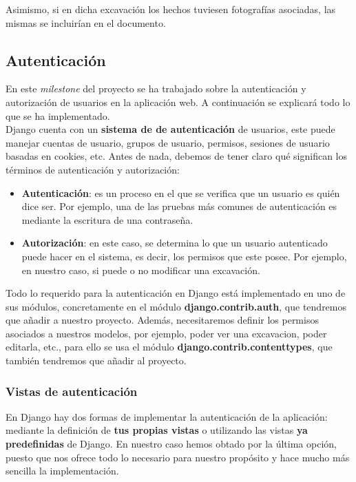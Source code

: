 Asimismo, si en dicha excavación los hechos tuviesen fotografías asociadas, las mismas
se incluirían en el documento.

\subsection{Autenticación}
En este \textit{milestone} del proyecto se ha trabajado sobre la autenticación y
autorización de usuarios en la aplicación web. A continuación se explicará todo lo que se
ha implementado.\\

Django cuenta con un \textbf{sistema de de autenticación} \cite{django-auth} de usuarios,
este puede manejar cuentas de usuario, grupos de usuario, permisos, sesiones de usuario
basadas en cookies, etc. Antes de nada, debemos de tener claro qué significan los términos
de autenticación y autorización:

    \begin{itemize}
        \item \textbf{Autenticación}: es un proceso en el que se verifica que un usuario
        es quién dice ser. Por ejemplo, una de las pruebas más comunes de autenticación
        es mediante la escritura de una contraseña.
        \item \textbf{Autorización}: en este caso, se determina lo que un usuario
        autenticado puede hacer en el sistema, es decir, los permisos que este posee. Por
        ejemplo, en nuestro caso, si puede o no modificar una excavación.
    \end{itemize}

Todo lo requerido para la autenticación en Django está implementado en uno de sus módulos,
concretamente en el módulo \textbf{django.contrib.auth}, que tendremos que añadir a
nuestro proyecto. Además, necesitaremos definir los permisos asociados a nuestros modelos,
por ejemplo, poder ver una excavacion, poder editarla, etc., para ello se usa el módulo
\textbf{django.contrib.contenttypes}, que también tendremos que añadir al proyecto.

\subsubsection{Vistas de autenticación}
En Django hay dos formas de implementar la autenticación de la aplicación: mediante la
definición de \textbf{tus propias vistas} o utilizando las vistas \textbf{ya predefinidas}
de Django. En nuestro caso hemos obtado por la última opción, puesto que nos ofrece todo lo
necesario para nuestro propósito y hace mucho más sencilla la implementación.\\

